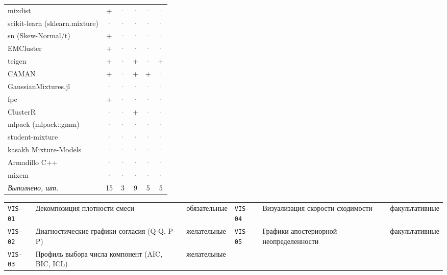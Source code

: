 \documentclass[10pt,a4paper]{article}
\begin{document}
\begin{landscape}
{\begin{longtable}{@{}l *{5}{c}@{}}
mixdist & \cellcolor{yes!35}+ & \textcolor{gray}{·} & \textcolor{gray}{·} & \textcolor{gray}{·} & \textcolor{gray}{·} \\
scikit-learn (sklearn.mixture) & \textcolor{gray}{·} & \textcolor{gray}{·} & \textcolor{gray}{·} & \textcolor{gray}{·} & \textcolor{gray}{·} \\
sn (Skew-Normal/t) & \cellcolor{yes!35}+ & \textcolor{gray}{·} & \textcolor{gray}{·} & \textcolor{gray}{·} & \textcolor{gray}{·} \\
EMCluster & \cellcolor{yes!35}+ & \textcolor{gray}{·} & \textcolor{gray}{·} & \textcolor{gray}{·} & \textcolor{gray}{·} \\
teigen & \cellcolor{yes!35}+ & \textcolor{gray}{·} & \cellcolor{yes!35}+ & \textcolor{gray}{·} & \cellcolor{yes!35}+ \\
CAMAN & \cellcolor{yes!35}+ & \textcolor{gray}{·} & \cellcolor{yes!35}+ & \cellcolor{yes!35}+ & \textcolor{gray}{·} \\
GaussianMixtures.jl & \textcolor{gray}{·} & \textcolor{gray}{·} & \textcolor{gray}{·} & \textcolor{gray}{·} & \textcolor{gray}{·} \\
fpc & \cellcolor{yes!35}+ & \textcolor{gray}{·} & \textcolor{gray}{·} & \textcolor{gray}{·} & \textcolor{gray}{·} \\
ClusterR & \textcolor{gray}{·} & \textcolor{gray}{·} & \cellcolor{yes!35}+ & \textcolor{gray}{·} & \textcolor{gray}{·} \\
mlpack (mlpack::gmm) & \textcolor{gray}{·} & \textcolor{gray}{·} & \textcolor{gray}{·} & \textcolor{gray}{·} & \textcolor{gray}{·} \\
student-mixture & \textcolor{gray}{·} & \textcolor{gray}{·} & \textcolor{gray}{·} & \textcolor{gray}{·} & \textcolor{gray}{·} \\
kasakh Mixture-Models & \textcolor{gray}{·} & \textcolor{gray}{·} & \textcolor{gray}{·} & \textcolor{gray}{·} & \textcolor{gray}{·} \\
Armadillo C++ & \textcolor{gray}{·} & \textcolor{gray}{·} & \textcolor{gray}{·} & \textcolor{gray}{·} & \textcolor{gray}{·} \\
mixem & \textcolor{gray}{·} & \textcolor{gray}{·} & \textcolor{gray}{·} & \textcolor{gray}{·} & \textcolor{gray}{·} \\
\midrule \textit{Выполнено, шт.} & 15 & 3 & 9 & 5 & 5 \\
\bottomrule
\end{longtable}}
{\scriptsize\setlength{\tabcolsep}{3pt}
\begin{tabular}{@{}l >{\raggedright\arraybackslash}p{7.4cm} l l >{\raggedright\arraybackslash}p{7.4cm} l@{}}
\texttt{VIS-01} & Декомпозиция плотности смеси & обязательные & \texttt{VIS-04} & Визуализация скорости сходимости & факультативные \\
\texttt{VIS-02} & Диагностические графики согласия (Q-Q, P-P) & желательные & \texttt{VIS-05} & Графики апостериорной неопределенности & факультативные \\
\texttt{VIS-03} & Профиль выбора числа компонент (AIC, BIC, ICL) & желательные &  & &  \\
\end{tabular}}


\end{landscape}
\end{document}
